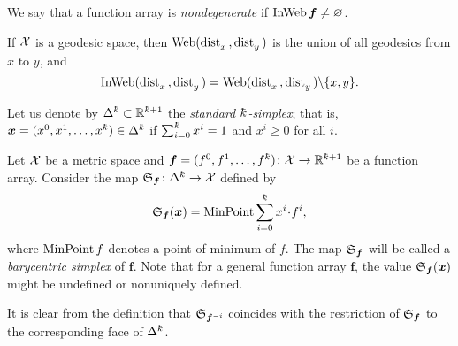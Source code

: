 We say that a function array is \emph{nondegenerate} 
if $\mathop{\rm InWeb}\nolimits\bm{f}\not=\varnothing$.

If $\mathcal{X}$ is a geodesic space, 
then $\mathop{\rm Web}\nolimits(\mathop{\rm dist}\nolimits_{x}^{{}}{}{},\mathop{\rm dist}\nolimits_{y}^{{}}{}{})$ is the union of all geodesics from $x$ to $y$, and 
\[\mathop{\rm InWeb}\nolimits(\mathop{\rm dist}\nolimits_{x}^{{}}{}{},\mathop{\rm dist}\nolimits_{y}^{{}}{}{})=\mathop{\rm Web}\nolimits(\mathop{\rm dist}\nolimits_{x}^{{}}{}{},\mathop{\rm dist}\nolimits_{y}^{{}}{}{})\backslash\{x,y\}.\]

Let us denote by $\Delta^\kay\subset \RR^{\kay+1}$ 
the \emph{standard $\kay$-simplex}; 
that is, $\bm{x}=(x^0,x^1,\dots,x^\kay)\in\Delta^\kay$ if $\sum_{i=0}^\kay x^i=1$ and $x^i\ge0$ for all $i$.

Let $\mathcal{X}$ be a metric space 
and $\bm{f}=(f^0,f^1,\dots,f^\kay)\:\spc{X}\to \RR^{\kay+1}$ be a function array.
Consider the map $\spx{\bm{f}}\:\Delta^\kay\to \spc{X}$ defined by 
\[\spx{\bm{f}}(\bm{x})=\argmin\sum_{i=0}^\kay x^i\cdot f^i,\]
where $\mathop{\rm MinPoint} f$\index{$\argmin$} denotes a point of minimum of $f$.
The map $\mathfrak{S}_{\bm{f}}$ will be called a \emph{barycentric simplex} of $\bm{f}$.
Note that for a general function array $\bm{f}$, 
the value $\mathfrak{S}_{\bm{f}}(\bm{x})$ might be undefined or nonuniquely defined.

It is clear from the definition that $\mathfrak{S}_{\bm{f}^{{-} i}}$ 
coincides with the restriction of $\mathfrak{S}_{\bm{f}}$ to the corresponding face of $\Delta^\kay$.


